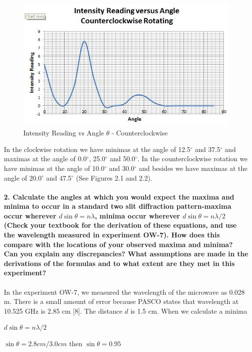 \documentclass[a4paper,12pt]{report}
\begin{document}
\begin{figure}[!h]
\centering
\includegraphics[width=1.0\linewidth, height=0.42\textheight]{c-clock}
\caption{Intensity Reading vs Angle $\theta$ - Counterclockwise}
\label{fig:c-clock}
\end{figure}
In the clockwise rotation we have minimas at the angle of 12.5$^{\circ}$ and 37.5$^{\circ}$ and maximas at the angle of 0.0$^{\circ}$, 25.0$^{\circ}$ and 50.0$^{\circ}$. In the counterclockwise rotation we have minimas at the angle of 10.0$^{\circ}$ and 30.0$^{\circ}$ and besides we have maximas at the angle of 20.0$^{\circ}$ and 47.5$^{\circ}$ (See Figures 2.1 and 2.2).\\\\
\textbf{2. Calculate the angles at which you would expect the maxima and minima to occur in a standard two slit diffraction pattern-maxima occur wherever $d\sin\theta=n\lambda$, minima occur wherever $d\sin\theta=n \lambda/2$ (Check your textbook for the derivation of these equations, and use the wavelength measured in experiment OW-7). How does this compare with the locations of your observed maxima and minima? Can you explain any discrepancies? What assumptions are made in the derivations of the formulas and to what extent are they met in this experiment?}\\\\ 
In the experiment OW-7, we measured the wavelength of the microwave as 0.028 m. There is a small amount of error because PASCO states that wavelength at 10.525 GHz is 2.85 cm [8]. The distance $d$ is 1.5 cm. When we calculate a minima
\begin{center}
	$d\sin\theta=n\lambda/2$
\end{center}
\begin{center}
	$\sin\theta=2.8 cm/3.0cm$ then $\sin\theta=0.95$
\end{center}
\end{document}
